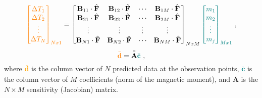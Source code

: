 \begin{equation}
\textcolor{orange}{\begin{bmatrix}
    \Delta T_1 \\ \Delta T_2 \\ \vdots \\ \Delta T_N
\end{bmatrix}_{Nx1}} = \begin{bmatrix}
    \mathbf{B}_{11} \cdot \hat{\mathbf{F}} & \mathbf{B}_{12} \cdot \hat{\mathbf{F}} & \cdots & \mathbf{B}_{1M} \cdot \hat{\mathbf{F}} \\
    \mathbf{B}_{21} \cdot \hat{\mathbf{F}} & \mathbf{B}_{22} \cdot \hat{\mathbf{F}} & \cdots & \mathbf{B}_{2M} \cdot \hat{\mathbf{F}} \\
    \vdots & \vdots & \vdots & \vdots \\
    \mathbf{B}_{N1} \cdot \hat{\mathbf{F}} & \mathbf{B}_{N2} \cdot \hat{\mathbf{F}} & \cdots & \mathbf{B}_{NM} \cdot \hat{\mathbf{F}} \\
\end{bmatrix}_{NxM} \textcolor{teal}{\begin{bmatrix}
    m_1 \\ m_2 \\ \vdots \\ m_j
\end{bmatrix}_{Mx1}} \ ,
\end{equation}
\begin{equation}
    \textcolor{orange}{\bar{\mathbf{d}}} = \bar{\bar{\mathbf{A}}} \textcolor{teal}{\bar{\mathbf{c}}}
    \ ,
\end{equation}
where \textcolor{orange}{$\bar{\mathbf{d}}$} is the column vector of $N$ predicted data at the observation points, \textcolor{teal}{$\bar{\mathbf{c}}$} is the column vector of $M$ coefficients (norm of the magnetic moment), and $\bar{\bar{\mathbf{A}}}$ is the $N \times M$ sensitivity (Jacobian) matrix. 

